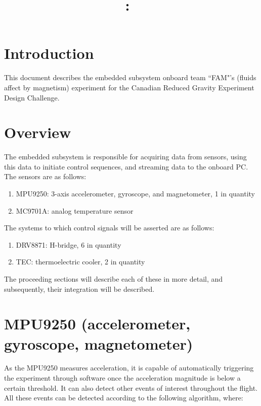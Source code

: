 \documentclass{article}
\title{
	\vspace{2in}
	\textmd{\textbf{\compName:\ \docTitle}}\\
	\vspace{0.1in}
	\vspace{3in}
}
\author{\textbf{\authorName}}
\begin{document}
\maketitle
\clearpage

%
%
%
%

\section*{Introduction} \label{intro}
This document describes the embedded subsystem onboard team ``FAM"'s (fluids affect by magnetism) experiment for the Canadian Reduced Gravity Experiment Design Challenge.

\clearpage

%
%
%
%

\tableofcontents
\clearpage


%
%
%
%

\section{Overview} \label{overview}
The embedded subsystem is responsible for acquiring data from sensors, using this data to initiate control sequences, and streaming data to the onboard PC. The sensors are as follows:

\begin{enumerate}
	\item MPU9250: 3-axis accelerometer, gyroscope, and magnetometer, 1 in quantity
	\item MC9701A: analog temperature sensor
\end{enumerate}

The systems to which control signals will be asserted are as follows:

\begin{enumerate}
	\item DRV8871: H-bridge, 6 in quantity
	\item TEC: thermoelectric cooler, 2 in quantity
\end{enumerate}

The proceeding sections will describe each of these in more detail, and subsequently, their integration will be described.

\clearpage

%
%
%
%

\section{MPU9250 (accelerometer, gyroscope, magnetometer)} \label{MPU}
As the MPU9250 measures acceleration, it is capable of automatically triggering the experiment through software once the acceleration magnitude is below a certain threshold. It can also detect other events of interest throughout the flight. All these events can be detected according to the following algorithm, where:
\end{document}
